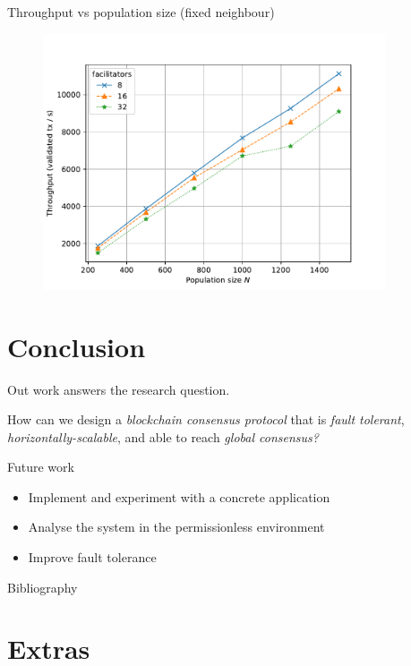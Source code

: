 \documentclass{beamer}
\begin{document}
\begin{frame}{Throughput vs population size (fixed neighbour)}
  \begin{figure}[h]
  \includegraphics[width=0.9\textwidth]{throughput-vs-population-large}
  \centering
  \end{figure}
\end{frame}

\section{Conclusion}
\begin{frame}{\secname}
  Out work answers the research question.
  \begin{block}{}
    How can we design a \emph{blockchain consensus protocol} that is \emph{fault tolerant},
    \emph{horizontally-scalable}, and able to reach \emph{global consensus?}
  \end{block}
\end{frame}

\begin{frame}{Future work}
\begin{itemize}
\item Implement and experiment with a concrete application
\item Analyse the system in the permissionless environment
\item Improve fault tolerance
\end{itemize}
\end{frame}

\begin{frame}{Bibliography}
\printbibliography
\end{frame}

\section*{Extras}
\end{document}
